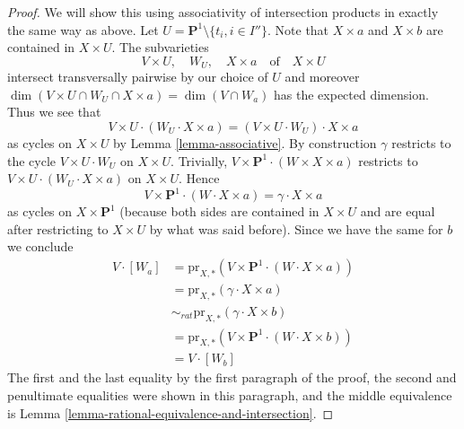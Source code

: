 \begin{proof}
\medskip\noindent
We will show this using associativity of intersection products in exactly
the same way as above. Let $U = \mathbf{P}^1 \setminus \{t_i, i \in I''\}$.
Note that $X \times a$ and $X \times b$ are contained in $X \times U$.
The subvarieties
$$
V \times U,\quad W_U,\quad X \times a\quad\text{of}\quad X \times U
$$
intersect transversally pairwise by our choice of $U$ and moreover
$\dim(V \times U \cap W_U \cap X \times a) = \dim(V \cap W_a)$ has
the expected dimension. Thus we see that
$$
V \times U \cdot (W_U \cdot X \times a) =
(V \times U \cdot W_U) \cdot X \times a
$$
as cycles on $X \times U$ by Lemma \ref{lemma-associative}.
By construction $\gamma$ restricts to the cycle $V \times U \cdot W_U$
on $X \times U$. Trivially,
$V \times \mathbf{P}^1 \cdot (W \times X \times a)$ restricts
to $V \times U \cdot (W_U \cdot X \times a)$ on $X \times U$.
Hence
$$
V \times \mathbf{P}^1 \cdot (W \cdot X \times a) =
\gamma \cdot X \times a
$$
as cycles on $X \times \mathbf{P}^1$ (because both sides
are contained in $X \times U$ and are equal after restricting
to $X \times U$ by what was said before). Since we have the same for $b$
we conclude
\begin{align*}
V \cdot [W_a]
& =
\text{pr}_{X,*}(V \times \mathbf{P}^1 \cdot (W \cdot X\times a)) \\
& =
\text{pr}_{X, *}(\gamma \cdot X \times a) \\
& \sim_{rat} 
\text{pr}_{X, *}(\gamma \cdot X \times b) \\
& =
\text{pr}_{X,*}(V \times \mathbf{P}^1 \cdot (W \cdot X\times b)) \\
& =
V \cdot [W_b]
\end{align*}
The first and the last equality by the first paragraph of the proof,
the second and penultimate equalities were shown in this paragraph, and
the middle equivalence is
Lemma \ref{lemma-rational-equivalence-and-intersection}.
\end{proof}
